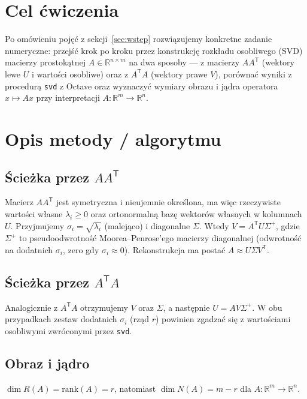 \documentclass[polish]{template/projectreport}
\begin{document}
\section{Cel ćwiczenia}
Po omówieniu pojęć z sekcji~\ref{sec:wstep} rozwiązujemy konkretne zadanie numeryczne: przejść krok po kroku przez konstrukcję rozkładu osobliwego (SVD) macierzy prostokątnej
$A\in\mathbb{R}^{n\times m}$ na dwa sposoby --- z macierzy $AA^{\mathsf{T}}$ (wektory lewe $U$ i wartości osobliwe)
oraz z $A^{\mathsf{T}}A$ (wektory prawe $V$), porównać wyniki z procedurą \texttt{svd} z Octave
oraz wyznaczyć wymiary obrazu i jądra operatora $x\mapsto Ax$ przy interpretacji
$A:\mathbb{R}^{m}\to\mathbb{R}^{n}$.

\section{Opis metody / algorytmu}
\subsection{Ścieżka przez $AA^{\mathsf{T}}$}
Macierz $AA^{\mathsf{T}}$ jest symetryczna i nieujemnie określona, ma więc rzeczywiste wartości własne
$\lambda_i\ge 0$ oraz ortonormalną bazę wektorów własnych w kolumnach $U$.
Przyjmujemy $\sigma_i=\sqrt{\lambda_i}$ (malejąco) i diagonalne $\Sigma$.
Wtedy $V=A^{\mathsf{T}}U\Sigma^{+}$, gdzie $\Sigma^{+}$ to pseudoodwrotność Moorea--Penrose’ego macierzy diagonalnej
(odwrotność na dodatnich $\sigma_i$, zero gdy $\sigma_i\approx 0$). Rekonstrukcja ma postać $A\approx U\Sigma V^{\mathsf{T}}$.

\subsection{Ścieżka przez $A^{\mathsf{T}}A$}
Analogicznie z $A^{\mathsf{T}}A$ otrzymujemy $V$ oraz $\Sigma$, a następnie $U=AV\Sigma^{+}$.
W obu przypadkach zestaw dodatnich $\sigma_i$ (rząd $r$) powinien zgadzać się z wartościami osobliwymi zwróconymi przez \texttt{svd}.

\subsection{Obraz i jądro}
$\dim R(A)=\mathrm{rank}(A)=r$, natomiast $\dim N(A)=m-r$ dla $A:\mathbb{R}^{m}\to\mathbb{R}^{n}$.
\end{document}
